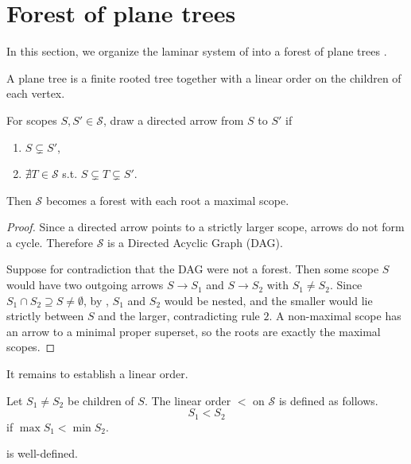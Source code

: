 \section{Forest of plane trees} \label{sec:tree}
In this section, we organize the laminar system of  into a forest of plane trees \parencite{harary}.
\begin{definition} \label{def:plane}
    A plane tree is a finite rooted tree together with a linear order on the children of each vertex.
\end{definition}
\begin{proposition} \label{proposition:forest}
    For scopes $S,S'\in\mathcal{S}$, draw a directed arrow from $S$ to $S'$ if
    \begin{enumerate}
        \item $S\subsetneq S'$,
        \item $\nexists T\in\mathcal{S}$ s.t. $S\subsetneq T\subsetneq S'$.
    \end{enumerate}
    Then $\mathcal{S}$ becomes a forest with each root a maximal scope.
\end{proposition}
\begin{proof}
    Since a directed arrow points to a strictly larger scope, arrows do not form a cycle. Therefore $\mathcal{S}$ is a Directed Acyclic Graph (DAG).

    Suppose for contradiction that the DAG were not a forest. Then some scope $S$ would have two outgoing arrows $S\to S_1$ and $S\to S_2$ with $S_1\neq S_2$. Since $S_1\cap S_2\supseteq S\neq\emptyset$, by , $S_1$ and $S_2$ would be nested, and the smaller would lie strictly between $S$ and the larger, contradicting rule $2$. A non-maximal scope has an arrow to a minimal proper superset, so the roots are exactly the maximal scopes.
\end{proof}
It remains to establish a linear order.
\begin{definition} \label{def:linear-order}
    Let $S_1\neq S_2$ be children of $S$. The linear order $<$ on $\mathcal{S}$ is defined as follows.
    \begin{equation*}
        S_1<S_2
    \end{equation*}
    if $\max S_1<\min S_2$.
\end{definition}
\begin{proposition}
     is well-defined.
\end{proposition}
